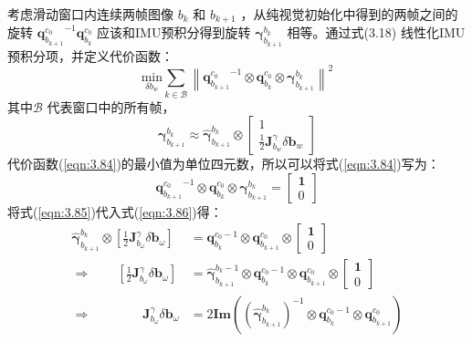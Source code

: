 考虑滑动窗口内连续两帧图像 $ b_k $ 和 $b_{k+1}$ ，从纯视觉初始化中得到的两帧之间的旋转 $ {\mathbf{q}_{b_{k+1}}^{c_0}}^{-1} \mathbf{q}_{b_k}^{c_0} $  应该和IMU预积分得到旋转 $ \bm{\gamma}_{b_{k+1}}^{b_k} $ 相等。通过式(3.18) 线性化IMU预积分项，并定义代价函数：
\begin{equation}
\label{eqn:3.84}
\underset{\delta b_w}{\text{min}}\sum_{k\in \mathcal{B} }\left\|{\mathbf{q}_{b_{k+1}}^{c_0}}^{-1}\otimes\mathbf{q}_{b_k}^{c_0}\otimes\bm{\gamma}_{b_{k+1}}^{b_k}\right\|^2 
\end{equation}
其中$\mathcal{B} $ 代表窗口中的所有帧，
\begin{equation}
\label{eqn:3.85}
\bm{\gamma}_{b_{k+1}}^{b_k}\approx\hat{\bm{\gamma}}_{b_{k+1}}^{b_k}\otimes\begin{bmatrix}
1 \\ \frac{1}{2}\mathbf{J}_{b_w}^\gamma\delta\mathbf{b}_w
\end{bmatrix}
\end{equation}
代价函数(\ref{eqn:3.84})的最小值为单位四元数，所以可以将式(\ref{eqn:3.84})写为：
\begin{equation}
\label{eqn:3.86}
{ \mathbf{ q}_{b_{k+1}}^{c_{0}}}^{-1} \otimes \mathbf{q}_{b_{k}}^{c_{0}} \otimes \bm{\gamma}_{b_{k+1}}^{b_{k}}=\left[ \begin{array}{l}{\mathbf{1}} \\ {0}\end{array}\right]
\end{equation}
将式(\ref{eqn:3.85})代入式(\ref{eqn:3.86})得：
\begin{equation}
\label{eqn:3.87}
\begin{aligned}
\hat{\bm{\gamma}}_{b_{k+1}}^{b_{k}} \otimes\left[\frac{1}{2} \mathbf{J}_{b_{\omega}}^{\gamma} \delta \mathbf{b}_{\omega}\right]
&= \mathbf{q}_{b_{k}}^{c_{0}-1} \otimes \mathbf{q}_{b_{k+1}}^{c_{0}} \otimes \left[ \begin{array}{l}{\mathbf{1}} \\ {0}\end{array}\right] \\
\Longrightarrow \quad \quad \left[\frac{1}{2} \mathbf{J}_{b_{\omega}}^{\gamma} \delta \mathbf{b}_{\omega}\right]
&= \hat{\bm{\gamma}}_{b_{k+1}}^{b_{k}-1} \otimes \mathbf{q}_{b_{k}}^{c_{0}-1} \otimes \mathbf{q}_{b_{k+1}}^{c_{0}} \otimes \left[ \begin{array}{l}{\mathbf{1}} \\ {0}\end{array}\right] \\
\Longrightarrow \quad \quad \quad \quad  \mathbf{J}_{b_{\omega}}^{\gamma} \delta \mathbf{ b}_{\omega} 
&=2 \mathbf{Im}\left( (\hat{\bm{\gamma}}^{b_{k}}_{b_{k+1}})^{-1} \otimes \mathbf{q}_{b_{k}}^{c_{0}-1} \otimes \mathbf{q}_{b_{k+1}}^{c_{0}}\right)
\end{aligned}
\end{equation}
